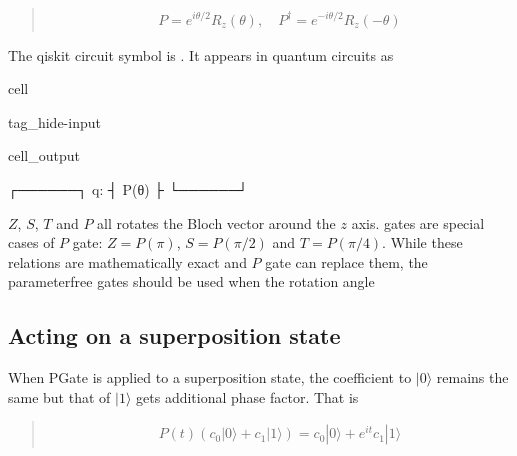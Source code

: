 \documentclass[letterpaper,10pt,english]{jupyterBook}
\begin{document}
\sphinxAtStartPar
{}
\begin{quote}
\begin{equation*}
\begin{split}
P = e^{i \theta/2} R_z(\theta), \quad P^\dagger = e^{-i \theta/2} R_z(-\theta)
\end{split}
\end{equation*}\end{quote}

\sphinxAtStartPar
The qiskit circuit symbol is . It appears in quantum circuits as

\begin{sphinxuseclass}{cell}
\begin{sphinxuseclass}{tag_hide-input}\begin{sphinxVerbatimOutput}

\begin{sphinxuseclass}{cell_output}
\begin{sphinxVerbatim}[commandchars=\\\{\}]
   ┌──────┐
q: ┤ P(θ) ├
   └──────┘
\end{sphinxVerbatim}

\end{sphinxuseclass}\end{sphinxVerbatimOutput}

\end{sphinxuseclass}
\end{sphinxuseclass}
\sphinxAtStartPar
\(Z\), \(S\), \(T\) and \(P\) all rotates the Bloch vector around the \(z\) axis. gates are special cases of \(P\) gate: \(Z=P(\pi)\), \(S=P(\pi/2)\) and \(T=P(\pi/4)\). While these relations are mathematically exact and \(P\) gate can replace them, the parameter\sphinxhyphen{}free gates should be used when the rotation angle


\subsection{Acting on a superposition state}
\label{\detokenize{q1gates/p:acting-on-a-superposition-state}}
\sphinxAtStartPar
When PGate is applied to a superposition state, the coefficient to \(|0\rangle\) remains the same but that of \(|1\rangle\) gets additional phase factor.  That is
\begin{quote}
\begin{equation}\label{equation:q1gates/p:P-on-superpos}
\begin{split}
P(t) \left (c_0 |0\rangle + c_1 |1\rangle\right) = c_0 |0\rangle + e^{it} c_1 |1\rangle
\end{split}
\end{equation}\end{quote}
\end{document}
